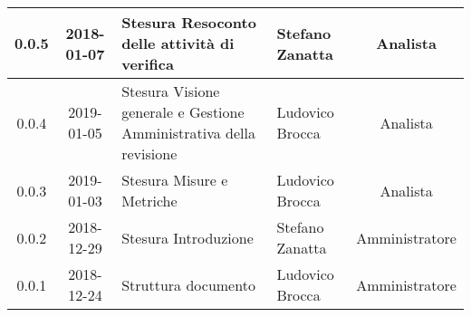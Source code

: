 \begin{center}
\begin{tabularx}{\textwidth}{|c|c|X|X|c|}
			\hline
			0.0.5 & 2018-01-07 & Stesura Resoconto delle attività di verifica & Stefano Zanatta & Analista\\
			\hline
			0.0.4 & 2019-01-05 & Stesura Visione generale e Gestione Amministrativa della revisione  & Ludovico Brocca& Analista\\
			\hline	
			0.0.3 & 2019-01-03& Stesura Misure e Metriche &Ludovico Brocca & Analista\\
			\hline
			0.0.2 & 2018-12-29 & Stesura Introduzione & Stefano Zanatta & Amministratore\\
			\hline
			0.0.1 & 2018-12-24 & Struttura documento & Ludovico Brocca & Amministratore\\
			\hline
		\end{tabularx}
	\end{center}
\newpage